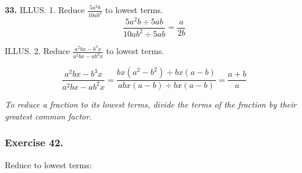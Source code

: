 \documentclass{book}
\begin{document}
\textbf{ 33.} \textsc{ILLUS.} 1. Reduce $\frac{5a^2b}{10ab^2}$ to
lowest terms.
\[
\frac{5a^2b \div 5ab}{10ab^2 \div 5ab} = \frac{a}{2b}
\]

\textsc{ILLUS.} 2. Reduce $\frac{a^2bx-b^3x}{a^2bx-ab^2x}$ to
lowest terms.

\begin{displaymath}
\frac{a^2bx-b^3x}{a^2bx-ab^2x} = \frac{bx(a^2-b^2) \div bx(a-b)}{abx(a-b) \div bx(a-b)} = \frac{a+b}{a}
\end{displaymath}


\textit{ To reduce a fraction to its lowest terms, divide the
terms of the fraction by their greatest common factor.}

\subsubsection*{Exercise 42.}

Reduce to lowest terms:
\end{document}
